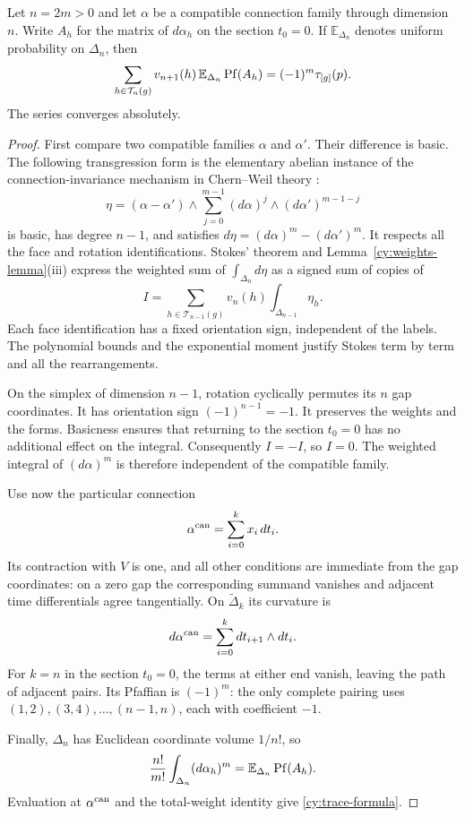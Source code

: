 \begin{proposition}\label{cy:trace-identity}
Let $n=2m>0$ and let $\alpha$ be a compatible connection family through
dimension $n$. Write $A_h$ for the matrix of $d\alpha_h$ on the section
$t_0=0$. If $\mathbb E_{\Delta_n}$ denotes uniform probability on
$\Delta_n$, then
\begin{equation}\label{cy:trace-formula}
 \sum_{h\in\mathcal T_n(g)}v_{n+1}(h)\,
       \mathbb E_{\Delta_n}\operatorname{Pf}(A_h)
   =(-1)^m\tau_{[g]}(p).
\end{equation}
The series converges absolutely.
\end{proposition}
\begin{proof}
First compare two compatible families $\alpha$ and $\alpha'$.
Their difference is basic. The following transgression form is the
elementary abelian instance of the connection-invariance mechanism in
Chern--Weil theory \cite[Sections~2--3]{ChernSimons1974}:
\[
 \eta=(\alpha-\alpha')\wedge
       \sum_{j=0}^{m-1}(d\alpha)^j\wedge(d\alpha')^{m-1-j}
\]
is basic, has degree $n-1$, and satisfies
$d\eta=(d\alpha)^m-(d\alpha')^m$. It respects all the face and
rotation identifications. Stokes' theorem and
Lemma~\ref{cy:weights-lemma}\textup{(iii)} express the weighted sum of
$\int_{\Delta_n}d\eta$ as a signed sum of copies of
\[
 I=\sum_{h\in\mathcal T_{n-1}(g)}v_n(h)
                       \int_{\Delta_{n-1}}\eta_h.
\]
Each face identification has a fixed orientation sign, independent
of the labels. The polynomial bounds and the exponential moment
justify Stokes term by term and all the rearrangements.

On the simplex of dimension $n-1$, rotation cyclically permutes its
$n$ gap coordinates. It has orientation sign $(-1)^{n-1}=-1$.
It preserves the weights and the forms. Basicness ensures that
returning to the section $t_0=0$ has no additional effect on the
integral. Consequently $I=-I$, so $I=0$. The weighted integral of
$(d\alpha)^m$ is therefore independent of the compatible family.

Use now the particular connection
\[
 \alpha^{\rm can}=\sum_{i=0}^k x_i\,dt_i.
\]
Its contraction with $V$ is one, and all other conditions are immediate
from the gap coordinates: on a zero gap the corresponding summand
vanishes and adjacent time differentials agree tangentially.
On $\widetilde\Delta_k$ its curvature is
\[
 d\alpha^{\rm can}=\sum_{i=0}^k dt_{i+1}\wedge dt_i.
\]
For $k=n$ in the section $t_0=0$, the terms at either end vanish,
leaving the path of adjacent pairs. Its Pfaffian is $(-1)^m$:
the only complete pairing uses $(1,2),(3,4),\ldots,(n-1,n)$,
each with coefficient $-1$.

Finally, $\Delta_n$ has Euclidean coordinate volume $1/n!$, so
\begin{equation}\label{cy:factorials}
 \frac{n!}{m!}\int_{\Delta_n}(d\alpha_h)^m
 =\mathbb E_{\Delta_n}\operatorname{Pf}(A_h).
\end{equation}
Evaluation at $\alpha^{\rm can}$ and the total-weight identity give
\eqref{cy:trace-formula}.
\end{proof}


